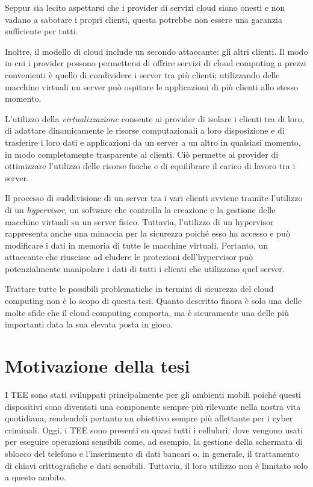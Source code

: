 \documentclass[12pt,italian]{report}
\begin{document}
Seppur sia lecito aspettarsi che i provider di servizi cloud siano onesti
e non vadano a sabotare i propri clienti, questa potrebbe non essere
una garanzia sufficiente per tutti.

Inoltre, il modello di cloud include un secondo attaccante: gli altri
clienti.
Il modo in cui i provider possono permettersi di offrire servizi di cloud
computing a prezzi convenienti è quello di condividere i server tra più
clienti; utilizzando delle macchine virtuali un server
può ospitare le applicazioni di più clienti allo stesso momento.

L'utilizzo della \textit{virtualizzazione} consente ai provider di isolare
i clienti tra di loro, di adattare
dinamicamente le risorse computazionali a loro disposizione e di trasferire
i loro dati e applicazioni da un server a un altro in qualsiasi
momento, in modo completamente trasparente ai clienti.
Ciò permette ai provider di ottimizzare l'utilizzo delle risorse
fisiche e di equilibrare il carico di lavoro tra i server.

Il processo di suddivisione di un server tra i vari clienti avviene tramite
l'utilizzo di un \textit{hypervisor}, un software che controlla la creazione
e la gestione delle macchine virtuali su un server fisico.
Tuttavia, l'utilizzo di un hypervisor rappresenta anche una minaccia per
la sicurezza poiché esso ha accesso e può modificare i dati in memoria
di tutte le macchine virtuali.
Pertanto, un attaccante che riuscisse ad eludere le protezioni
dell'hypervisor può potenzialmente manipolare i dati di tutti i clienti
che utilizzano quel server.

Trattare tutte le possibili problematiche in termini di sicurezza del
cloud computing non è lo scopo di questa tesi.
Quanto descritto finora è solo una delle molte sfide che il cloud computing
comporta, ma è sicuramente una delle più importanti data la sua elevata
posta in gioco.

\section{Motivazione della tesi}
\label{sec:motivazione}
I TEE sono stati sviluppati principalmente per gli ambienti mobili
poiché questi dispositivi sono diventati una componente sempre più
rilevante nella nostra vita quotidiana, rendendoli pertanto un
obiettivo sempre più allettante per i cyber criminali.
Oggi, i TEE sono presenti su quasi tutti i cellulari, dove vengono
usati per eseguire operazioni sensibili come, ad esempio, la gestione
della schermata di sblocco del telefono e l'inserimento di dati bancari
o, in generale, il trattamento di chiavi crittografiche e dati sensibili.
Tuttavia, il loro utilizzo non è limitato solo a questo ambito.
\end{document}
